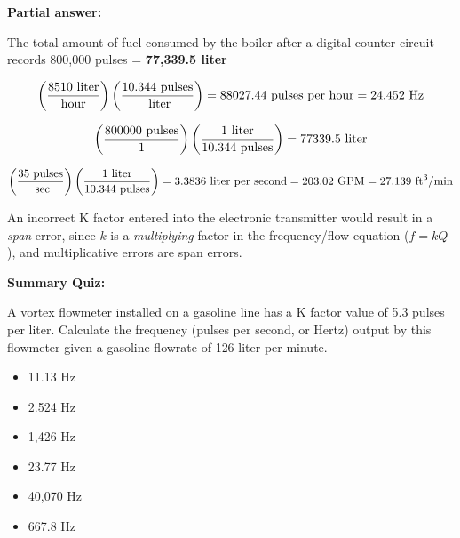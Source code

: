 





\noindent
{\bf Partial answer:}

\vskip 10pt

The total amount of fuel consumed by the boiler after a digital counter circuit records 800,000 pulses = {\bf 77,339.5 liter} 







$$\left({8510 \hbox{ liter} \over \hbox{hour}} \right) \left( {10.344 \hbox{ pulses} \over \hbox{ liter}} \right) = 88027.44 \hbox{ pulses per hour} = 24.452 \hbox{ Hz}$$

\vskip 10pt

$$\left({800000 \hbox{ pulses} \over 1} \right) \left({ 1 \hbox{ liter} \over 10.344 \hbox{ pulses}} \right) = 77339.5 \hbox{ liter}$$

\vskip 10pt

$$\left({35 \hbox{ pulses} \over \hbox{ sec}} \right) \left({ 1 \hbox{ liter} \over 10.344 \hbox{ pulses}} \right) = 3.3836 \hbox{ liter per second} = 203.02 \hbox{ GPM} = 27.139 \hbox{ ft}^3\hbox{/min}$$

\vskip 10pt

An incorrect K factor entered into the electronic transmitter would result in a {\it span} error, since $k$ is a {\it multiplying} factor in the frequency/flow equation ($f = kQ$), and multiplicative errors are span errors.







\vfil \eject

\noindent
{\bf Summary Quiz:}

A vortex flowmeter installed on a gasoline line has a K factor value of 5.3 pulses per liter.  Calculate the frequency (pulses per second, or Hertz) output by this flowmeter given a gasoline flowrate of 126 liter per minute.

\begin{itemize}
\item{} 11.13 Hz
\vskip 5pt 
\item{} 2.524 Hz
\vskip 5pt 
\item{} 1,426 Hz
\vskip 5pt 
\item{} 23.77 Hz
\vskip 5pt 
\item{} 40,070 Hz
\vskip 5pt 
\item{} 667.8 Hz
\end{itemize}




